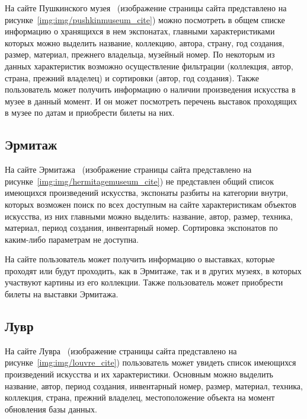На сайте Пушкинского музея~\cite{pushkinmuseum} (изображение страницы сайта представлено на рисунке~\ref{img:img/pushkinmuseum_cite}) можно посмотреть в общем списке информацию о хранящихся в нем экспонатах, главными характеристиками которых можно выделить название, коллекцию, автора, страну, год создания, размер, материал, прежнего владельца, музейный номер. По некоторым из данных характеристик возможно осуществление фильтрации (коллекция, автор, страна, прежний владелец) и сортировки (автор, год создания). Также пользователь может получить информацию о наличии произведения искусства в музее в данный момент. И он может посмотреть перечень выставок проходящих в музее по датам и приобрести билеты на них.

\FloatBarrier
{}
\FloatBarrier

\subsection{Эрмитаж}

На сайте Эрмитажа~\cite{hermitagemuseum} (изображение страницы сайта представлено на рисунке~\ref{img:img/hermitagemuseum_cite}) не представлен общий список имеющихся произведений искусства, экспонаты разбиты на категории внутри, которых возможен поиск по всех доступным на сайте характеристикам объектов искусства, из них главными можно выделить: название, автор, размер, техника, материал, период создания, инвентарный номер. Сортировка экспонатов по каким-либо параметрам не доступна.

На сайте пользователь может получить информацию о выставках, которые проходят или будут проходить, как в Эрмитаже, так и в других музеях, в которых участвуют картины из его коллекции. Также пользователь может приобрести билеты на выставки Эрмитажа.

\FloatBarrier
{}
\FloatBarrier

\subsection{Лувр}

На сайте Лувра~\cite{louvre} (изображение страницы сайта представлено на рисунке~\ref{img:img/louvre_cite}) пользователь может увидеть список имеющихся произведений искусства и их характеристики. Основным можно выделить название, автор, период создания, инвентарный номер, размер, материал, техника, коллекция, страна, прежний владелец, местоположение объекта на момент обновления базы данных.

